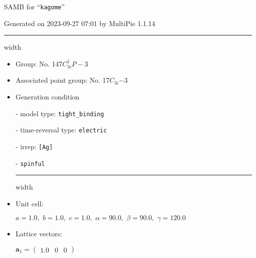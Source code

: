 \documentclass[fleqn,10pt,landscape]{article}
\begin{document}
\setcounter{MaxMatrixCols}{16}

\setlength{\baselineskip}{16pt}
\footnotesize
\begin{center}
\LARGE
SAMB for ``\texttt{kagome}''
\end{center}
\begin{flushright}
Generated on 2023-09-27 07:01 by MultiPie 1.1.14
\end{flushright}
\vspace{1cm}


 \hfil \hrule height 1mm width \textwidth \hfil

\begin{itemize}
\item Group: No. 147\quad$C_{3i}^{1}$\quad$P-3$\quad[ trigonal ]

\item Associated point group: No. 17\quad$C_{3i}$\quad$-3$\quad[ trigonal ]

\vspace{5mm}

\item Generation condition

\quad - model type: \texttt{tight_binding}

\quad - time-reversal type: \texttt{electric}

\quad - irrep: \texttt{[Ag]}

\quad - \texttt{spinful}


 \hfil \hrule height 1mm width \textwidth \hfil

\item Unit cell:

\quad $a=1.0,\,\, b=1.0,\,\, c=1.0,\,\, \alpha=90.0,\,\, \beta=90.0,\,\, \gamma=120.0$

\item Lattice vectors:

\quad $\bm{a}_1=\begin{pmatrix} 1.0 & 0 & 0 \end{pmatrix}$


\end{itemize}
\end{document}
